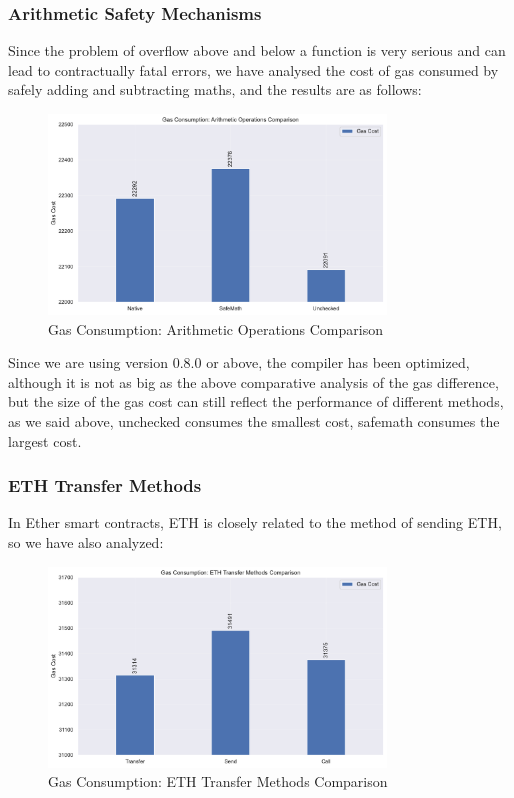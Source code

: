 \subsubsection{Arithmetic Safety Mechanisms}
Since the problem of overflow above and below a function is very serious and can lead to contractually fatal errors, we have analysed the cost of gas consumed by safely adding and subtracting maths, and the results are as follows:

\begin{figure}[h]
    \centering
    \includegraphics[width=0.8\textwidth]{figures/arithmetic_comparison.pdf}
    \caption{Gas Consumption: Arithmetic Operations Comparison}
    \label{fig:arithmetic_comparison}
\end{figure}

Since we are using version 0.8.0 or above, the compiler has been optimized, although it is not as big as the above comparative analysis of the gas difference, but the size of the gas cost can still reflect the performance of different methods, as we said above, unchecked consumes the smallest cost, safemath consumes the largest cost.

\subsubsection{ETH Transfer Methods}
In Ether smart contracts, ETH is closely related to the method of sending ETH, so we have also analyzed:

\begin{figure}[h]
    \centering
    \includegraphics[width=0.8\textwidth]{figures/transfer_comparison.pdf}
    \caption{Gas Consumption: ETH Transfer Methods Comparison}
    \label{fig:transfer_comparison}
\end{figure}

